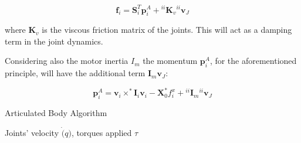 $$
\mathbf{f} _i = \mathbf{S} ^T _i \mathbf{p} ^A _i + {} ^{ii} \mathbf{K} _v {} ^{ii}\mathbf{v} _J
$$

where $\mathbf{K} _v$ is the viscous friction matrix of the joints. This will act as a damping term in the joint dynamics.

Considering also the motor inertia $I _m$ the momentum $\mathbf{p} ^A _i$, for the aforementioned principle, will have the additional term $\mathbf{I} _m \mathbf{v} _J$:

$$
\mathbf{p} ^A _i = \mathbf{v} _i \times ^* \mathbf{I} _i \mathbf{v} _i - \mathbf{X} ^* _0 f ^x _i + {} ^{ii}\mathbf{I} _m {} ^{ii}\mathbf{v} _J
$$


\begin{algorithm}[H]
    \caption{Articulated Body Algorithm}
    \label{alg:aba}
    \begin{algorithmic}[1]
    \REQUIRE Joints' velocity $\dot(q)$, torques applied $\tau$
    \ENDFOR 

    \ENDFOR

        \ELSE
        \ENDIF
    \ENDFOR
    \end{algorithmic}
\end{algorithm} 
